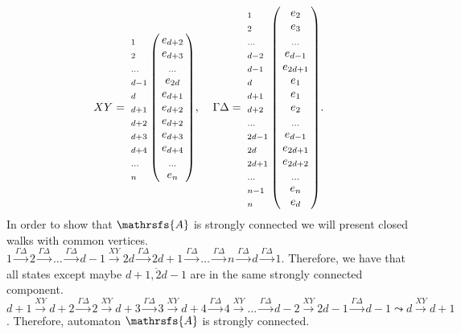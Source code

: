 \documentclass[11pt]{llncs}
\newcommand{\A}{\mathrsfs{A}}
\newcommand{\G}{\Gamma}
\newcommand{\D}{\Delta}
\begin{document}
$$
XY =
\bordermatrix{    ~  &    ~     \cr
                  _1 & e_{d+2}  \cr
                  _2 & e_{d+3}  \cr
                  _{\ldots} & _{\ldots} \cr
                  _{d - 1} & e_{2d}  \cr
                  _d & e_{d+1}  \cr
                  _{d+1} & e_{d+2}  \cr
                  _{d+2} & e_{d+2}  \cr
                  _{d+3} & e_{d+3}  \cr
                  _{d+4} & e_{d+4}  \cr
                  _{\ldots} & _{\ldots} \cr
                  _{n} & e_{n}  \cr
             }, \;\;\;\;
\G\D =
\bordermatrix{    ~  &    ~     \cr
                  _1 & e_{2}  \cr
                  _2 & e_{3}  \cr
                  _{\ldots} & _{\ldots} \cr
                  _{d - 2} & e_{d - 1}  \cr
                  _{d - 1} & e_{2d + 1}  \cr
                  _d & e_{1}  \cr
                  _{d+1} & e_{1}  \cr
                  _{d+2} & e_{2}  \cr
                  _{\ldots} & _{\ldots} \cr
                  _{2d-1} & e_{d-1}  \cr
                  _{2d} & e_{2d+1}  \cr
                  _{2d+1} & e_{2d+2}  \cr
                  _{\ldots} & _{\ldots} \cr
                  _{n-1} & e_{n}  \cr
                  _{n} & e_{d}  \cr
             }.
$$
In order to show that $\A$ is strongly connected we will present closed walks with common vertices.
$1\xrightarrow{\G\D}2\xrightarrow{\G\D}\ldots\xrightarrow{\G\D}d-1\xrightarrow{XY}2d\xrightarrow{\G\D}2d+1\xrightarrow{\G\D}\ldots
\xrightarrow{\G\D}n\xrightarrow{\G\D}d\xrightarrow{\G\D}1$. Therefore, we have that all states except maybe $\overline{d+1,2d -1}$ are in
the same strongly connected component.
$d+1\xrightarrow{XY}d+2\xrightarrow{\G\D}2\xrightarrow{XY}d+3\xrightarrow{\G\D}3\xrightarrow{XY}d+4\xrightarrow{\G\D}
4\xrightarrow{XY}\ldots\xrightarrow{\G\D}d-2\xrightarrow{XY}2d-1\xrightarrow{\G\D}d-1\leadsto d\xrightarrow{XY}d+1$. Therefore, automaton
$\A$ is strongly connected.
\end{document}
